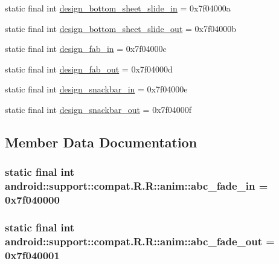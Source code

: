 \begin{CompactItemize}
\item 
static final int \hyperlink{classandroid_1_1support_1_1compat_1_1_r_1_1anim_6e1b9dc6623c187c4b8dde40f769b922}{design\_\-bottom\_\-sheet\_\-slide\_\-in} = 0x7f04000a
\item 
static final int \hyperlink{classandroid_1_1support_1_1compat_1_1_r_1_1anim_42e9278f6fc29f81a4af50407f34027c}{design\_\-bottom\_\-sheet\_\-slide\_\-out} = 0x7f04000b
\item 
static final int \hyperlink{classandroid_1_1support_1_1compat_1_1_r_1_1anim_a652ae56074979c3201b1037d897ebb0}{design\_\-fab\_\-in} = 0x7f04000c
\item 
static final int \hyperlink{classandroid_1_1support_1_1compat_1_1_r_1_1anim_c5237a2ff0680027cee2289ca23d5afd}{design\_\-fab\_\-out} = 0x7f04000d
\item 
static final int \hyperlink{classandroid_1_1support_1_1compat_1_1_r_1_1anim_579ff2378320b4496de45e964290be13}{design\_\-snackbar\_\-in} = 0x7f04000e
\item 
static final int \hyperlink{classandroid_1_1support_1_1compat_1_1_r_1_1anim_64be435c81e9486fd82b8973b83a5494}{design\_\-snackbar\_\-out} = 0x7f04000f
\end{CompactItemize}


\subsection{Member Data Documentation}
\hypertarget{classandroid_1_1support_1_1compat_1_1_r_1_1anim_d33449142fa6bbca5de60316ad14983f}{
\subsubsection[{abc\_\-fade\_\-in}]{\setlength{\rightskip}{0pt plus 5cm}static final int android::support::compat.R.R::anim::abc\_\-fade\_\-in = 0x7f040000}}
\label{classandroid_1_1support_1_1compat_1_1_r_1_1anim_d33449142fa6bbca5de60316ad14983f}


\hypertarget{classandroid_1_1support_1_1compat_1_1_r_1_1anim_4e1bc4ef9b35b754f8463fa27d4021ed}{
\subsubsection[{abc\_\-fade\_\-out}]{\setlength{\rightskip}{0pt plus 5cm}static final int android::support::compat.R.R::anim::abc\_\-fade\_\-out = 0x7f040001}}
\label{classandroid_1_1support_1_1compat_1_1_r_1_1anim_4e1bc4ef9b35b754f8463fa27d4021ed}


